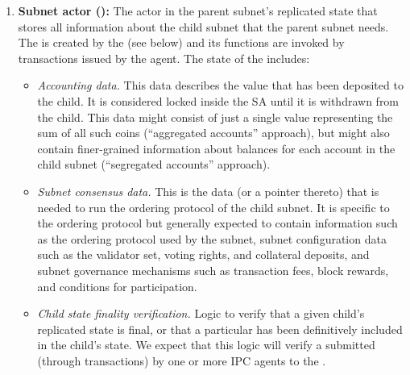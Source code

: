 \begin{enumerate}
    \item \textbf{Subnet actor (\sa):} The actor in the parent subnet's replicated state
    that stores all information about the child subnet that the parent subnet needs.
    The \sa is created by the \gw (see below) and its functions are invoked by transactions issued by the \ipc agent.
    The state of the \sa includes:
    \begin{itemize}

        \item \emph{Accounting data.}
        This data describes the value that has been deposited to the child.
        It is considered locked inside the SA until it is withdrawn from the child.
        This data might consist of just a single value representing the sum of all such coins (``aggregated accounts'' approach), 
        but might also contain finer-grained information about balances for each account in the child subnet (``segregated accounts'' approach).

        \item \emph{Subnet consensus data.}
        This is the data (or a pointer thereto) that is needed to run the ordering protocol of the child subnet.
        It is specific to the ordering protocol but generally expected to contain information such as the ordering protocol used by the subnet, subnet configuration data such as the validator set, voting rights, and collateral deposits, and subnet governance mechanisms such as transaction fees, block rewards, and conditions for participation.         

        \item \emph{Child state finality verification.} Logic to verify that a given child's replicated state is final,
        or that a particular \tx has been definitively included in the child's state.
        We expect that this logic will verify a \pof submitted (through transactions) by one or more IPC agents to the \sa.
          

\end{itemize}
\end{enumerate}
